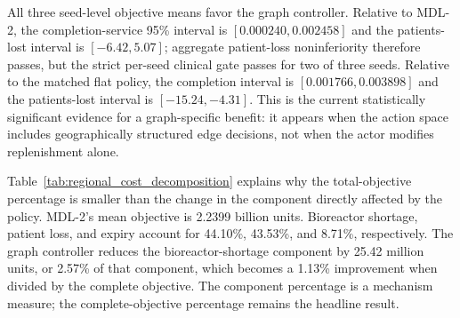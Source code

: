 \documentclass[preprint,review,12pt]{elsarticle}
\begin{document}
\begin{table}[htbp]
\centering
\caption{Three-seed abrupt-regional-shift comparisons. Objective differences are in millions of modeled weighted-objective units. Each comparison contains 300 paired holdout outcomes.}
\label{tab:regional_network_pairs}
\end{table}

All three seed-level objective means favor the graph controller. Relative to
MDL-2, the completion-service 95\% interval is
$[0.000240,0.002458]$ and the patients-lost interval is
$[-6.42,5.07]$; aggregate patient-loss noninferiority therefore passes, but
the strict per-seed clinical gate passes for two of three seeds. Relative to
the matched flat policy, the completion interval is
$[0.001766,0.003898]$ and the patients-lost interval is
$[-15.24,-4.31]$. This is the current statistically significant evidence for
a graph-specific benefit: it appears when the action space includes
geographically structured edge decisions, not when the actor modifies
replenishment alone.

Table~\ref{tab:regional_cost_decomposition} explains why the total-objective
percentage is smaller than the change in the component directly affected by
the policy. MDL-2's mean objective is 2.2399 billion units. Bioreactor
shortage, patient loss, and expiry account for 44.10\%, 43.53\%, and 8.71\%,
respectively. The graph controller reduces the bioreactor-shortage component
by 25.42 million units, or 2.57\% of that component, which becomes a 1.13\%
improvement when divided by the complete objective. The component percentage
is a mechanism measure; the complete-objective percentage remains the
headline result.
\end{document}
